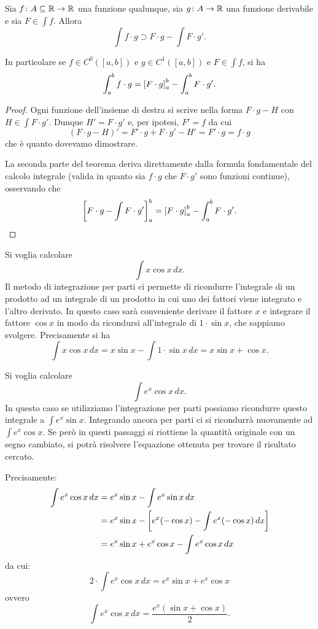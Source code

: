 \begin{theorem}
\mymark{*}%
%
%
Sia $f\colon A\subseteq {\mathbb R} \to {\mathbb R}$ una funzione qualunque, sia $g\colon A \to{\mathbb R}$
una funzione derivabile
e sia $F \in \int f$.
Allora
\[
  \int f\cdot g \supset F \cdot g - \int F \cdot g'.
\]

In particolare se $f\in C^0([a,b])$ e $g\in C^1([a,b])$
e $F \in \int f$, si ha
\[
  \int_a^b f\cdot g = {\left[ F\cdot g \right]}_a^b - \int_a^b F \cdot g'.
\]
\end{theorem}
%
\begin{proof}
\mymark{*}
Ogni funzione dell'insieme di destra si scrive nella forma
$F\cdot g - H$ con $H \in \int F \cdot g'$.
Dunque $H' = F \cdot g'$ e, per ipotesi, $F'=f$ da cui
\[
(F\cdot g - H)' = F' \cdot g + F \cdot g' - H' = F' \cdot g
= f\cdot g
\]
che è quanto dovevamo dimostrare.

La seconda parte del teorema
deriva direttamente dalla formula fondamentale del calcolo integrale
(valida in quanto sia $f\cdot g$ che $F \cdot g'$ sono funzioni continue),
osservando che
\[
{\left[ F\cdot g - \int F \cdot g' \right]}_a^b
= {\left[ F\cdot g \right]}_a^b - \int_a^b F \cdot g'.
\]
\end{proof}

\begin{example}
Si voglia calcolare
\[
  \int x \cos x\, dx.
\]
Il metodo di integrazione per parti ci permette
di ricondurre l'integrale di un prodotto ad un integrale
di un prodotto in cui uno dei fattori viene integrato e l'altro derivato.
In questo caso sarà conveniente derivare il fattore $x$
e integrare il fattore $\cos x$ in modo da ricondursi all'integrale di
$1\cdot \sin x$, che sappiamo svolgere.
Precisamente si ha
\[
 \int x \cos x\, dx = x \sin x - \int 1 \cdot \sin x \, dx
  = x \sin x + \cos x.
\]
\end{example}

\begin{example}
  \label{ex:822309}
Si voglia calcolare
\[
 \int e^x \cos x\, dx.
\]
In questo caso se utilizziamo l'integrazione per parti possiamo ricondurre
questo integrale a $\int e^x \sin x$. Integrando ancora per parti ci si
ricondurrà nuovamente ad $\int e^x \cos x$. Se però in questi passaggi si
riottiene la quantità originale con un segno cambiato, si potrà risolvere
l'equazione ottenuta per trovare il risultato cercato.

Precisamente:
\begin{align*}
\int e^x \cos x\, dx
&= e^x \sin x - \int e^x \sin x\, dx\\
 &= e^x \sin x - {\left[ e^x(-\cos x) - \int e^x(-\cos x)\, dx \right]} \\
 &= e^x \sin x + e^x \cos x - \int e^x \cos x \, dx
\end{align*}
da cui:
\[
 2 \cdot \int e^x \cos x\, dx  = e^x \sin x + e^x \cos x
\]
ovvero
\[
  \int e^x \cos x\, dx = \frac{e^x(\sin x + \cos x)}{2}.
\]
\end{example}

